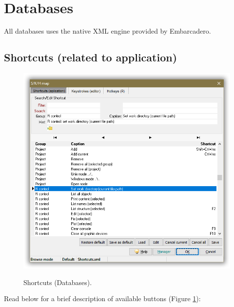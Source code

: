 
\hypertarget{working_databases}{}
\section{Databases}

All databases uses the native XML engine provided by Embarcadero.

\subsection{Shortcuts (related to application)}

\begin{figure}[H]
  \includegraphics[scale=0.35]{./res/shortcuts_dlg.png}\\
  \caption{Shortcuts (Databases).}
  \label{fig:shortcuts_dlg_2}
\end{figure}

Read below for a brief description of available buttons (Figure \ref{fig:shortcuts_dlg_2}):


